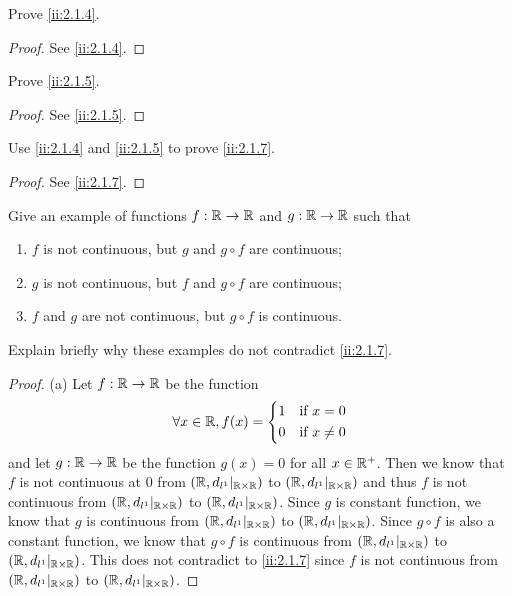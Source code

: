 \exercisesection

\begin{ex}\label{ii:ex:2.1.1}
  Prove \cref{ii:2.1.4}.
\end{ex}

\begin{proof}
  See \cref{ii:2.1.4}.
\end{proof}

\begin{ex}\label{ii:ex:2.1.2}
  Prove \cref{ii:2.1.5}.
\end{ex}

\begin{proof}
  See \cref{ii:2.1.5}.
\end{proof}

\begin{ex}\label{ii:ex:2.1.3}
  Use \cref{ii:2.1.4} and \cref{ii:2.1.5} to prove \cref{ii:2.1.7}.
\end{ex}

\begin{proof}
  See \cref{ii:2.1.7}.
\end{proof}

\begin{ex}\label{ii:ex:2.1.4}
  Give an example of functions \(f : \mathbb{R} \to \mathbb{R}\) and \(g : \mathbb{R} \to \mathbb{R}\) such that
  \begin{enumerate}
    \item \(f\) is not continuous, but \(g\) and \(g \circ f\) are continuous;
    \item \(g\) is not continuous, but \(f\) and \(g \circ f\) are continuous;
    \item \(f\) and \(g\) are not continuous, but \(g \circ f\) is continuous.
  \end{enumerate}
  Explain briefly why these examples do not contradict \cref{ii:2.1.7}.
\end{ex}

\begin{proof}{(a)}
  Let \(f : \mathbb{R} \to \mathbb{R}\) be the function
  \[
    \forall x \in \mathbb{R}, f(x) = \begin{dcases}
      1 & \text{if } x = 0    \\
      0 & \text{if } x \neq 0
    \end{dcases}
  \]
  and let \(g : \mathbb{R} \to \mathbb{R}\) be the function \(g(x) = 0\) for all \(x \in \mathbb{R}^+\).
  Then we know that \(f\) is not continuous at \(0\) from \((\mathbb{R}, d_{l^1}|_{\mathbb{R} \times \mathbb{R}})\) to \((\mathbb{R}, d_{l^1}|_{\mathbb{R} \times \mathbb{R}})\) and thus \(f\) is not continuous from \((\mathbb{R}, d_{l^1}|_{\mathbb{R} \times \mathbb{R}})\) to \((\mathbb{R}, d_{l^1}|_{\mathbb{R} \times \mathbb{R}})\).
  Since \(g\) is constant function, we know that \(g\) is continuous from \((\mathbb{R}, d_{l^1}|_{\mathbb{R} \times \mathbb{R}})\) to \((\mathbb{R}, d_{l^1}|_{\mathbb{R} \times \mathbb{R}})\).
  Since \(g \circ f\) is also a constant function, we know that \(g \circ f\) is continuous from \((\mathbb{R}, d_{l^1}|_{\mathbb{R} \times \mathbb{R}})\) to \((\mathbb{R}, d_{l^1}|_{\mathbb{R} \times \mathbb{R}})\).
  This does not contradict to \cref{ii:2.1.7} since \(f\) is not continuous from \((\mathbb{R}, d_{l^1}|_{\mathbb{R} \times \mathbb{R}})\) to \((\mathbb{R}, d_{l^1}|_{\mathbb{R} \times \mathbb{R}})\).
\end{proof}

